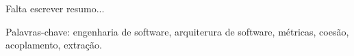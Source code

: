 \documentclass[normaltoc,capchap,capsec,times]{abnt}
\begin{document}
\capa
\folhaderosto

\begin{resumo}
 Falta escrever resumo...

 Palavras-chave: engenharia de software, arquiterura de software, métricas, coesão, acoplamento, extração.
\end{resumo}

\sumario



{}
\end{document}
